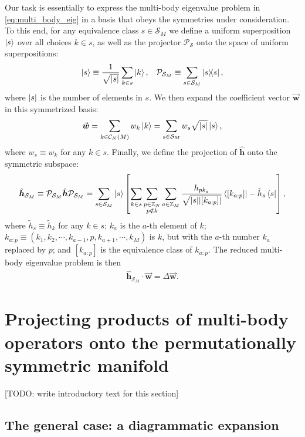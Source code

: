 \documentclass[nofootinbib,notitlepage,11pt]{revtex4-2}
\newcommand{\f}[2]{\dfrac{#1}{#2}} %
\newcommand{\p}[1]{\left(#1\right)} %
\renewcommand{\sp}[1]{\left[#1\right]} %
\renewcommand{\c}{\cdot} %
\newcommand{\m}{\bm} %
\renewcommand{\v}{\vec} %
\newcommand{\1}{\mathds{1}}
\newcommand{\C}{\mathcal{C}}
\renewcommand{\P}{\mathcal{P}}
\renewcommand{\S}{\mathcal{S}}
\newcommand{\ZZ}{\mathbb{Z}}
\newcommand{\red}[1]{{\color{red} #1}}
\begin{document}
Our task is essentially to express the multi-body eigenvalue problem
in \eqref{eq:multi_body_eig} in a basis that obeys the symmetries
under consideration.  To this end, for any equivalence class
$s\in\S_M$ we define a uniform superposition $\ket{s}$ over all
choices $k\in s$, as well as the projector $\P_\S$ onto the space of
uniform superpositions:
\begin{align}
  \ket{s} \equiv \f1{\sqrt{\abs{s}}} \sum_{k\in s} \ket{k},
  &&
  \P_{\S_M} \equiv \sum_{s\in\S_M} \op{s},
\end{align}
where $\abs{s}$ is the number of elements in $s$.  We then expand the
coefficient vector $\v{\m w}$ in this symmetrized basis:
\begin{align}
  \v{\m w} = \sum_{k\in\C_N\p{M}} w_k \ket{k}
  = \sum_{s\in\S_M} w_s \sqrt{\abs{s}} \ket{s},
\end{align}
where $w_s\equiv w_k$ for any $k\in s$.  Finally, we define the
projection of $\hat{\m h}$ onto the symmetric subspace:
\begin{align}
  \hat{\m h}_{\S_M}
  \equiv \P_{\S_M} \hat{\m h} \P_{\S_M}
  = \sum_{s\in\S_M} \ket{s} \sp{
    \sum_{k\in s} \sum_{\substack{p\in\ZZ_N\\p\notin k}} \sum_{a\in\ZZ_M}
    \f{h_{p k_a}}{\sqrt{\abs{s}\abs{\sp{k_{a:p}}}}} \bra{\sp{k_{a:p}}}
    - \tilde h_s \bra{s}},
\end{align}
where $\tilde h_s\equiv \tilde h_k$ for any $k\in s$; $k_a$ is the
$a$-th element of $k$;
$k_{a:p}\equiv\p{k_1,k_2,\cdots,k_{a-1},p,k_{a+1},\cdots,k_M}$ is $k$,
but with the $a$-th number $k_a$ replaced by $p$; and $\sp{k_{a:p}}$
is the equivalence class of $k_{a:p}$.  The reduced multi-body
eigenvalue problem is then
\begin{align}
  \hat{\m h}_{\S_M} \c \v{\m w} = \Delta \v{\m w}.
\end{align}

\section{Projecting products of multi-body operators onto the
  permutationally symmetric manifold}
\label{sec:operator_product}

\red{[TODO: write introductory text for this section]}

\subsection{The general case: a diagrammatic expansion}
\end{document}
